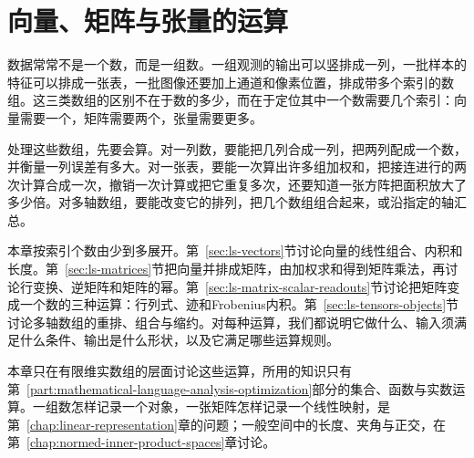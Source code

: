 \chapter{向量、矩阵与张量的运算}
\label{chap:linear-operations}

数据常常不是一个数，而是一组数。一组观测的输出可以竖排成一列，一批样本的特征可以排成一张表，一批图像还要加上通道和像素位置，排成带多个索引的数组。这三类数组的区别不在于数的多少，而在于定位其中一个数需要几个索引：向量需要一个，矩阵需要两个，张量需要更多。

处理这些数组，先要会算。对一列数，要能把几列合成一列，把两列配成一个数，并衡量一列误差有多大。对一张表，要能一次算出许多组加权和，把接连进行的两次计算合成一次，撤销一次计算或把它重复多次，还要知道一张方阵把面积放大了多少倍。对多轴数组，要能改变它的排列，把几个数组组合起来，或沿指定的轴汇总。

本章按索引个数由少到多展开。第~\ref{sec:ls-vectors}节讨论向量的线性组合、内积和长度。第~\ref{sec:ls-matrices}节把向量并排成矩阵，由加权求和得到矩阵乘法，再讨论行变换、逆矩阵和矩阵的幂。第~\ref{sec:ls-matrix-scalar-readouts}节讨论把矩阵变成一个数的三种运算：行列式、迹和Frobenius内积。第~\ref{sec:ls-tensors-objects}节讨论多轴数组的重排、组合与缩约。对每种运算，我们都说明它做什么、输入须满足什么条件、输出是什么形状，以及它满足哪些运算规则。

本章只在有限维实数组的层面讨论这些运算，所用的知识只有第~\ref{part:mathematical-language-analysis-optimization}部分的集合、函数与实数运算。一组数怎样记录一个对象，一张矩阵怎样记录一个线性映射，是第~\ref{chap:linear-representation}章的问题；一般空间中的长度、夹角与正交，在第~\ref{chap:normed-inner-product-spaces}章讨论。






